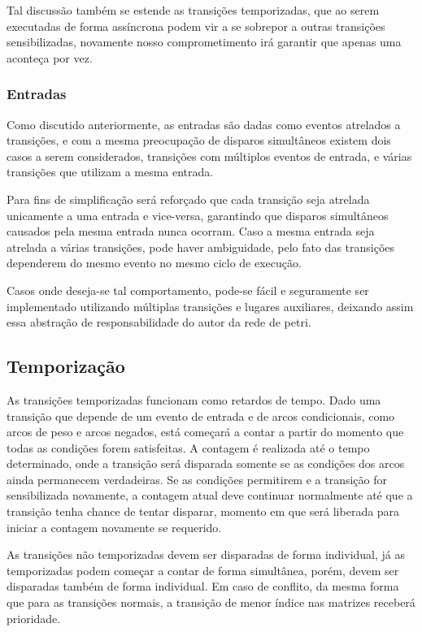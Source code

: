 Tal discussão também se estende as transições temporizadas, que ao serem executadas de forma assíncrona podem vir a se sobrepor a outras transições sensibilizadas, novamente nosso comprometimento irá garantir que apenas uma aconteça por vez.  

\subsubsection{Entradas}

Como discutido anteriormente, as entradas são dadas como eventos atrelados a transições, e com a mesma preocupação de disparos simultâneos existem dois casos a serem considerados, transições com múltiplos eventos de entrada, e várias transições que utilizam a mesma entrada.

Para fins de simplificação será reforçado que cada transição seja atrelada unicamente a uma entrada e vice-versa, garantindo que disparos simultâneos causados pela mesma entrada nunca ocorram. Caso a mesma entrada seja atrelada a várias transições, pode haver ambiguidade, pelo fato das transições dependerem do mesmo evento no mesmo ciclo de execução.

Casos onde deseja-se tal comportamento, pode-se fácil e seguramente ser implementado utilizando múltiplas transições e lugares auxiliares, deixando assim essa abstração de responsabilidade do autor da rede de petri.

\subsection{Temporização}

As transições temporizadas funcionam como retardos de tempo. Dado uma transição que depende de um evento de entrada e de arcos condicionais, como arcos de peso e arcos negados, está começará a contar a partir do momento que todas as condições forem satisfeitas. A contagem é realizada até o tempo determinado, onde a transição será disparada somente se as condições dos arcos ainda permanecem verdadeiras. Se as condições permitirem e a transição for sensibilizada novamente, a contagem atual deve continuar normalmente até que a transição tenha chance de tentar disparar, momento em que será liberada para iniciar a contagem novamente se requerido. 

As transições não temporizadas devem ser disparadas de forma individual, já as temporizadas podem começar a contar de forma simultânea, porém, devem ser disparadas também de forma individual. Em caso de conflito, da mesma forma que para as transições normais, a transição de menor índice nas matrizes receberá prioridade. 

